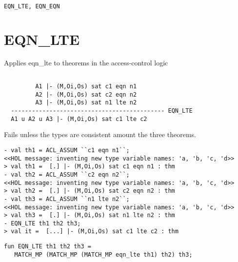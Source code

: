 \SEEALSO
\texttt{EQN\_LTE, EQN\_EQN}
\ENDDOC

\section{EQN\_LTE}



\egroup


\SYNOPSIS
Applies eqn\_lte to theorems in the access-control logic

\DESCRIBE
\begin{verbatim}

         A1 |- (M,Oi,Os) sat c1 eqn n1
         A2 |- (M,Oi,Os) sat c2 eqn n2  
         A3 |- (M,Oi,Os) sat n1 lte n2
  -------------------------------------------- EQN_LTE
  A1 u A2 u A3 |- (M,Oi,Os) sat c1 lte c2
\end{verbatim}
\FAILURE

Fails unless the types are consistent amount the three theorems.

\EXAMPLE
\begin{holboxed}
\begin{verbatim}
- val th1 = ACL_ASSUM ``c1 eqn n1``;
<<HOL message: inventing new type variable names: 'a, 'b, 'c, 'd>>
> val th1 =  [.] |- (M,Oi,Os) sat c1 eqn n1 : thm
- val th2 = ACL_ASSUM ``c2 eqn n2``;
<<HOL message: inventing new type variable names: 'a, 'b, 'c, 'd>>
> val th2 =  [.] |- (M,Oi,Os) sat c2 eqn n2 : thm
- val th3 = ACL_ASSUM ``n1 lte n2``;
<<HOL message: inventing new type variable names: 'a, 'b, 'c, 'd>>
> val th3 =  [.] |- (M,Oi,Os) sat n1 lte n2 : thm
- EQN_LTE th1 th2 th3;
> val it =  [...] |- (M,Oi,Os) sat c1 lte c2 : thm
\end{verbatim}
\end{holboxed}
\IMPLEMENTATION
\begin{holboxed}
\begin{verbatim}
fun EQN_LTE th1 th2 th3 =
   MATCH_MP (MATCH_MP (MATCH_MP eqn_lte th1) th2) th3;
\end{verbatim}
\end{holboxed}
\SEEALSO

